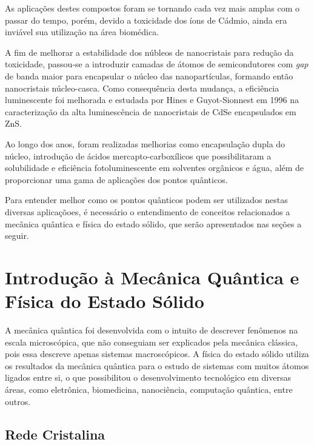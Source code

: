 \documentclass[11pt]{article}
\numberwithin{equation}{section}
\begin{document}
\par As aplicações destes compostos foram se tornando cada vez mais amplas com o passar do tempo, porém, devido a toxicidade dos íons de Cádmio, ainda era inviável sua utilização na área biomédica.

\par A fim de melhorar a estabilidade dos núbleos de nanocristais para redução da toxicidade, passou-se a introduzir camadas de átomos de semicondutores com \textit{gap} de banda maior para encapsular o núcleo das nanopartículas, formando então nanocristais núcleo-casca. Como consequência desta mudança, a eficiência luminescente foi melhorada e estudada por Hines e Guyot-Sionnest em 1996 na caracterização da alta luminescência de nanocristais de CdSe encapsulados em ZnS.

\par Ao longo dos anos, foram realizadas melhorias como encapsulação dupla do núcleo, introdução de ácidos mercapto-carboxílicos que possibilitaram a solubilidade e eficiência fotoluminescente em solventes orgânicos e água, além de proporcionar uma gama de aplicações dos pontos quânticos.

\par Para entender melhor como os pontos quânticos podem ser utilizados nestas diversas aplicaçõoes, é necessário o entendimento de conceitos relacionados a mecânica quântica e física do estado sólido, que serão apresentados nas seções a seguir.

\section{Introdução à Mecânica Quântica e Física do Estado Sólido} %

\par A mecânica quântica foi desenvolvida com o intuito de descrever fenômenos na escala microscópica, que não conseguiam ser explicados pela mecânica clássica, pois essa descreve apenas sistemas macroscópicos. A física do estado sólido utiliza os resultados da mecânica quântica para o estudo de sistemas com muitos átomos ligados entre si, o que possibilitou o desenvolvimento tecnológico em diversas áreas, como eletrônica, biomedicina, nanociência, computação quântica, entre outros.\cite{qm_fis1}


  \subsection{Rede Cristalina}
\end{document}

